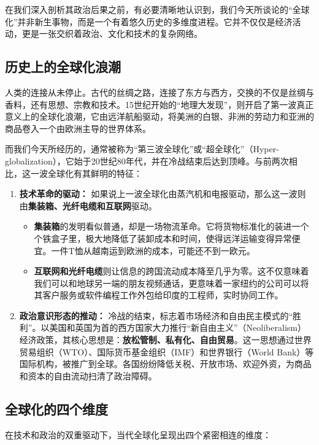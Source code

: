 在我们深入剖析其政治后果之前，有必要清晰地认识到，我们今天所谈论的“全球化”并非新生事物，而是一个有着悠久历史的多维度进程。它并不仅仅是经济活动，更是一张交织着政治、文化和技术的复杂网络。

\subsection{历史上的全球化浪潮}

人类的连接从未停止。古代的丝绸之路，连接了东方与西方，交换的不仅是丝绸与香料，还有思想、宗教和技术。15世纪开始的“地理大发现”，则开启了第一波真正意义上的全球化浪潮，它由远洋航船驱动，将美洲的白银、非洲的劳动力和亚洲的商品卷入一个由欧洲主导的世界体系。

而我们今天所经历的，通常被称为“第三波全球化”或“超全球化”（Hyper-globalization），它始于20世纪80年代，并在冷战结束后达到顶峰。与前两次相比，这一波全球化有其鲜明的特征：

\begin{enumerate}
\item \textbf{技术革命的驱动：} 如果说上一波全球化由蒸汽机和电报驱动，那么这一波则由\textbf{集装箱、光纤电缆和互联网}驱动。
\begin{itemize}
\item \textbf{集装箱}的发明看似普通，却是一场物流革命。它将货物标准化的装进一个个铁盒子里，极大地降低了装卸成本和时间，使得远洋运输变得异常便宜。一件T恤从越南运到欧洲的成本，可能还不到一欧元。
\item \textbf{互联网和光纤电缆}则让信息的跨国流动成本降至几乎为零。这不仅意味着我们可以和地球另一端的朋友视频通话，更意味着一家纽约的公司可以将其客户服务或软件编程工作外包给印度的工程师，实时协同工作。
\end{itemize}
\item \textbf{政治意识形态的推动：} 冷战的结束，标志着市场经济和自由民主模式的“胜利”。以美国和英国为首的西方国家大力推行“新自由主义”（Neoliberalism）经济政策，其核心思想是：\textbf{放松管制、私有化、自由贸易}。这一思想通过世界贸易组织（WTO）、国际货币基金组织（IMF）和世界银行（World Bank）等国际机构，被推广到全球。各国纷纷降低关税、开放市场、欢迎外资，为商品和资本的自由流动扫清了政治障碍。
\end{enumerate}

\subsection{全球化的四个维度}

在技术和政治的双重驱动下，当代全球化呈现出四个紧密相连的维度：

